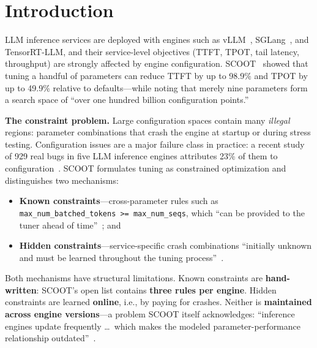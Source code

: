 \documentclass[journal]{IEEEtran}
\newcommand{\code}[1]{\texttt{#1}}
\begin{document}
\section{Introduction}

LLM inference services are deployed with engines such as vLLM~\cite{ref1}, SGLang~\cite{sglang}, and TensorRT-LLM, and their service-level objectives (TTFT, TPOT, tail latency, throughput) are strongly affected by engine configuration. SCOOT~\cite{ref2} showed that tuning a handful of parameters can reduce TTFT by up to 98.9\% and TPOT by up to 49.9\% relative to defaults---while noting that merely nine parameters form a search space of ``over one hundred billion configuration points.''

\textbf{The constraint problem.} Large configuration spaces contain many \emph{illegal} regions: parameter combinations that crash the engine at startup or during stress testing. Configuration issues are a major failure class in practice: a recent study of 929 real bugs in five LLM inference engines attributes 23\% of them to configuration~\cite{engbugs}. SCOOT formulates tuning as constrained optimization and distinguishes two mechanisms:
\begin{itemize}
  \item \textbf{Known constraints}---cross-parameter rules such as \code{max\_num\_batched\_tokens >= max\_num\_seqs}, which ``can be provided to the tuner ahead of time''~\cite{ref2}; and
  \item \textbf{Hidden constraints}---service-specific crash combinations ``initially unknown and must be learned throughout the tuning process''~\cite{ref2}.
\end{itemize}

Both mechanisms have structural limitations. Known constraints are \textbf{hand-written}: SCOOT's open list contains \textbf{three rules per engine}. Hidden constraints are learned \textbf{online}, i.e., by paying for crashes. Neither is \textbf{maintained across engine versions}---a problem SCOOT itself acknowledges: ``inference engines update frequently \ldots\ which makes the modeled parameter-performance relationship outdated''~\cite{ref2}.
\end{document}
